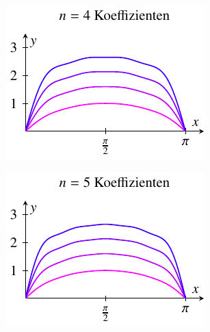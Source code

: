 \begin{figure}
	\begin{subfigure}{0.48\textwidth}
		\centering
		\includegraphics{papers/antennen/fig/a4.pdf}
	\end{subfigure}%
	\hfill
	\begin{subfigure}{0.48\textwidth}
		\centering
		\includegraphics{papers/antennen/fig/a5.pdf}

\end{subfigure}
\end{figure}
